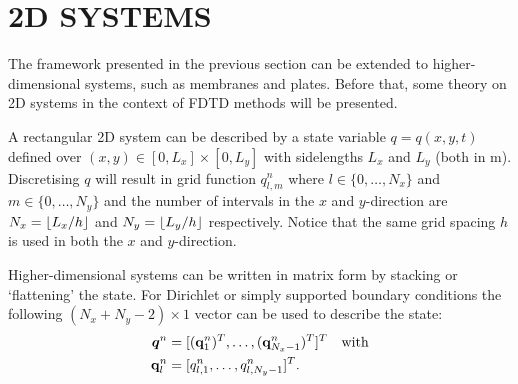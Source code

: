 \documentclass[fleqn]{jaes}
\begin{document}
\section{2D SYSTEMS}\label{sec:2D}
The framework presented in the previous section can be extended to higher-dimensional systems, such as membranes and plates. Before that, some theory on 2D systems in the context of FDTD methods will be presented.

A rectangular 2D system can be described by a state variable $q = q(x,y,t)$ defined over $(x ,y) \in [0, L_x] \times [0, L_y]$ with sidelengths $L_x$ and $L_y$ (both in m). Discretising $q$ will result in grid function $q_{l,m}^n$ where $l \in \{0, \hdots, N_x\}$ and $m \in \{0, \hdots, N_y\}$ and the number of intervals in the $x$ and $y$-direction are $N_x = \floor[L_x/h]$ and $N_y = \floor[L_y/h]$ respectively. Notice that the same grid spacing $h$ is used in both the $x$ and $y$-direction. 

Higher-dimensional systems can be written in matrix form by stacking or `flattening' the state. For Dirichlet or simply supported boundary conditions the following $(N_x + N_y - 2)\times 1$ vector can be used to describe the state:
\begin{equation}\label{eq:stackedQ}
    \begin{aligned}
        \qq^n &= [(\q_{1}^n)^T, \hdots, (\q_{N_x-1}^n)^T]^T \quad \text{with}\\
        \q_l^n &= [q_{l, 1}^n, \hdots, q_{l, N_y-1}^n ]^T.
    \end{aligned}
\end{equation}
\end{document}

